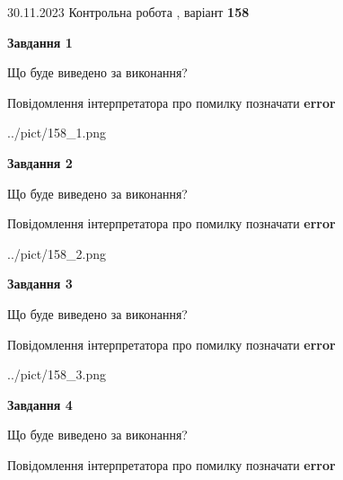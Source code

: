 \documentclass[12pt, ukrainian]{article}
\begin{document}
{{30.11.2023 Контрольна робота , варіант  \No \textbf { 158 }\par}}
{




{\begin {center}\textbf{Завдання 1}\end {center}}\par
Що буде виведено за виконання? \par
Повідомлення інтерпретатора про помилку позначати \textbf{error}

\begin{center}
	{../pict/158_1.png}
\end{center}
\newpage

{\begin {center}\textbf{Завдання 2}\end {center}}\par
Що буде виведено за виконання? \par
Повідомлення інтерпретатора про помилку позначати \textbf{error}

\begin{center}
	{../pict/158_2.png}
\end{center}
\newpage

{\begin {center}\textbf{Завдання 3}\end {center}}\par
Що буде виведено за виконання? \par
Повідомлення інтерпретатора про помилку позначати \textbf{error}

\begin{center}
	{../pict/158_3.png}
\end{center}
\newpage

{\begin {center}\textbf{Завдання 4}\end {center}}\par
Що буде виведено за виконання? \par
Повідомлення інтерпретатора про помилку позначати \textbf{error}

}
\end{document}
